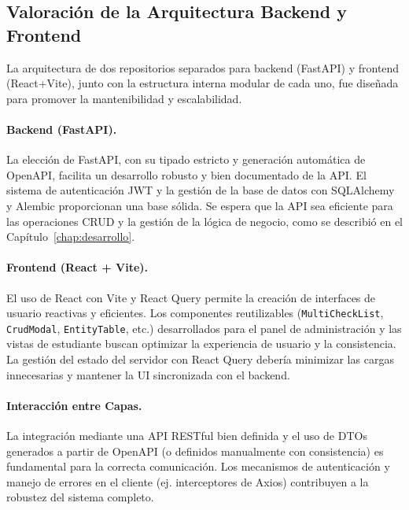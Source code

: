 \subsection{Valoración de la Arquitectura Backend y Frontend}
\label{ssec:eval_arquitectura_be_fe}

La arquitectura de dos repositorios separados para backend (FastAPI) y frontend (React+Vite), junto con la estructura interna modular de cada uno, fue diseñada para promover la mantenibilidad y escalabilidad.

\paragraph{Backend (FastAPI).}
La elección de FastAPI, con su tipado estricto y generación automática de OpenAPI, facilita un desarrollo robusto y bien documentado de la API. El sistema de autenticación JWT y la gestión de la base de datos con SQLAlchemy y Alembic proporcionan una base sólida. Se espera que la API sea eficiente para las operaciones CRUD y la gestión de la lógica de negocio, como se describió en el Capítulo~\ref{chap:desarrollo}.

\paragraph{Frontend (React + Vite).}
El uso de React con Vite y React Query permite la creación de interfaces de usuario reactivas y eficientes. Los componentes reutilizables (\texttt{MultiCheckList}, \texttt{CrudModal}, \texttt{EntityTable}, etc.) desarrollados para el panel de administración y las vistas de estudiante buscan optimizar la experiencia de usuario y la consistencia. La gestión del estado del servidor con React Query debería minimizar las cargas innecesarias y mantener la UI sincronizada con el backend.

\paragraph{Interacción entre Capas.}
La integración mediante una API RESTful bien definida y el uso de DTOs generados a partir de OpenAPI (o definidos manualmente con consistencia) es fundamental para la correcta comunicación. Los mecanismos de autenticación y manejo de errores en el cliente (ej. interceptores de Axios) contribuyen a la robustez del sistema completo.

